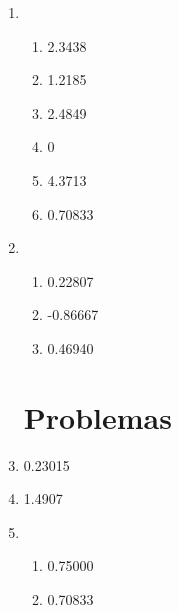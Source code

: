 \documentclass[a4paper]{article}
\providecommand{\sin}{} \renewcommand{\sin}{\hspace{2pt}\mathrm{sen}}
\newcommand{\ud}{\mathrm{\ d}}
\begin{document}
\begin{enumerate}
\item
  \begin{enumerate}
  \item 2.3438 %
  \item 1.2185 %
  \item 2.4849 %
  \item 0 %
  \item 4.3713 %
  \item 0.70833 %
  \end{enumerate}

\item 
  \begin{enumerate}
  \item 0.22807 %
  \item -0.86667 %
  \item 0.46940 %
  \end{enumerate}

\section{Problemas}
\item 0.23015

\item 1.4907

\item 
  \begin{enumerate}
  \item 0.75000

  \item 0.70833


\end{enumerate}
\end{enumerate}
\end{document}
